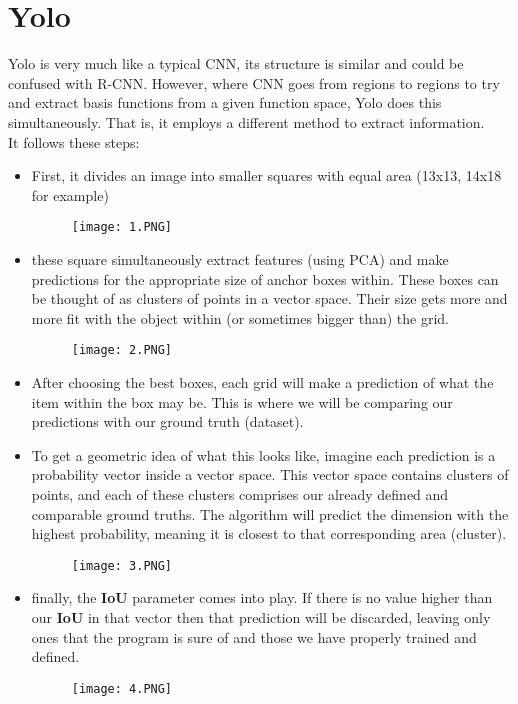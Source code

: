 \documentclass{article}
\begin{document}
\section{Yolo}
Yolo is very much like a typical CNN, its structure is similar and could be confused with R-CNN. However, where CNN goes from regions to regions to try and extract basis functions from a given function space, Yolo does this simultaneously. That is, it employs a different method to extract information.\\
It follows these steps:
\begin{itemize}
	\item First, it divides an image into smaller squares with equal area (13x13, 14x18 for example)
	\begin{figure}[h]
		\texttt{[image: 1.PNG]}
	\end{figure}
	\item these square simultaneously extract features (using PCA) and make predictions for the appropriate size of anchor boxes within. These boxes can be thought of as clusters of points in a vector space. Their size gets more and more fit with the object within (or sometimes bigger than) the grid.
	\begin{figure}[h]
		\texttt{[image: 2.PNG]}
	\end{figure}
	\item After choosing the best boxes, each grid will make a prediction of what the item within the box may be. This is where we will be comparing our predictions with our ground truth (dataset).
	\item To get a geometric idea of what this looks like, imagine each prediction is a probability vector inside a vector space. This vector space contains clusters of points, and each of these clusters comprises our already defined and comparable ground truths. The algorithm will predict the dimension with the highest probability, meaning it is closest to that corresponding area (cluster).
	\begin{figure}[h]
		\texttt{[image: 3.PNG]}
	\end{figure}	 
	\item finally, the \textbf{IoU} parameter comes into play. If there is no value higher than our \textbf{IoU} in that vector then that prediction will be discarded, leaving only ones that the program is sure of and those we have properly trained and defined.
	\begin{figure}[h]
		\texttt{[image: 4.PNG]}
	\end{figure}
\end{itemize}
\end{document}
